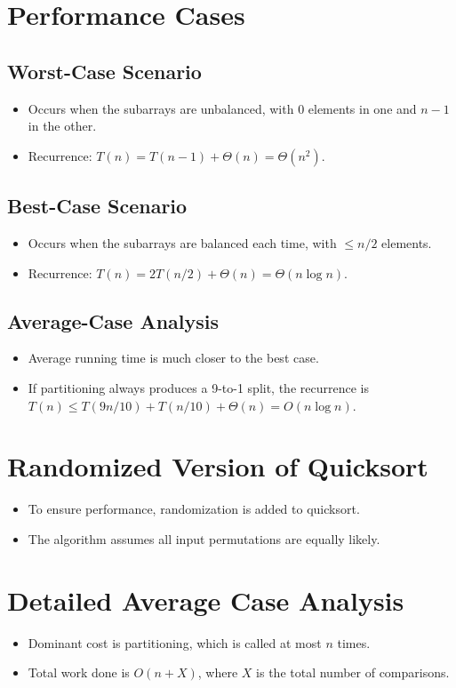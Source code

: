 \documentclass[12pt,openany]{book}
\theoremstyle{definition}
\begin{document}
\section{Performance Cases}
\subsection{Worst-Case Scenario}
\begin{itemize}
	\item Occurs when the subarrays are unbalanced, with 0 elements in one and \( n-1 \) in the other.
	\item Recurrence: \( T(n) = T(n-1) + \Theta(n) = \Theta(n^2) \).
\end{itemize}

\subsection{Best-Case Scenario}
\begin{itemize}
	\item Occurs when the subarrays are balanced each time, with \( \leq n/2 \) elements.
	\item Recurrence: \( T(n) = 2T(n/2) + \Theta(n) = \Theta(n \log n) \).
\end{itemize}

\subsection{Average-Case Analysis}
\begin{itemize}
	\item Average running time is much closer to the best case.
	\item If partitioning always produces a 9-to-1 split, the recurrence is \( T(n) \leq T(9n/10) + T(n/10) + \Theta(n) = O(n \log n) \).
\end{itemize}

\section{Randomized Version of Quicksort}
\begin{itemize}
	\item To ensure performance, randomization is added to quicksort.
	\item The algorithm assumes all input permutations are equally likely.
\end{itemize}

\section{Detailed Average Case Analysis}
\begin{itemize}
	\item Dominant cost is partitioning, which is called at most \( n \) times.
	\item Total work done is \( O(n + X) \), where \( X \) is the total number of comparisons.
\end{itemize}
\end{document}
